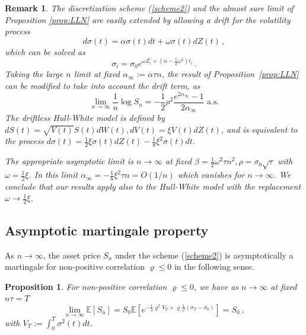 \documentclass[11pt]{article}
\numberwithin{equation}{section}
\theoremstyle{plain}
\newtheorem{proposition}[theorem]{Proposition}
\newtheorem{remark}[theorem]{Remark}
\begin{document}
\begin{remark}\label{rem:4}
The discretization scheme (\ref{scheme2}) and the almost sure limit of 
Proposition \ref{prop:LLN} are easily extended by allowing a drift 
for the volatility process 
\begin{equation}
d\sigma(t) = \alpha \sigma(t) dt + \omega \sigma(t) dZ(t)\,,
\end{equation}
which can be solved as
\begin{equation}
\sigma_i = \sigma_0 e^{\omega Z_i + (\alpha - \frac12\omega^2)t_i}\,.
\end{equation}
Taking the large $n$ limit at fixed $\alpha_\infty:=\alpha \tau n $,
the result of Proposition~\ref{prop:LLN}  can be modified to take into account 
the drift term, as
\begin{equation}
\lim_{n\to \infty} \frac{1}{n} \log S_n = - \frac12 \rho^2 
\frac{e^{2\alpha_\infty}-1}{2\alpha_\infty} \mbox{ a.s.}
\end{equation}
The driftless Hull-White model \cite{HW1987} is defined 
by $dS(t) = \sqrt{V(t)} S(t) dW(t), dV(t) = \xi V(t) dZ(t)$, 
and is equivalent to the
process $d\sigma(t) = \frac12 \xi \sigma(t) dZ(t) - \frac18 \xi^2 \sigma(t) dt$.

The appropriate asymptotic limit is $n\to \infty$ at fixed $\beta = \frac12
\omega^2 \tau n^2, \rho = \sigma_0\sqrt{\tau}$ with $\omega=\frac12\xi$. 
In this limit $\alpha_\infty=-\frac18 \xi^2\tau n = O(1/n)$ which vanishes
for $n\to \infty$. We conclude that our results apply also to the Hull-White 
model with the replacement $\omega \to \frac12\xi$.
\end{remark}



\subsection{Asymptotic martingale property}

As $n\rightarrow\infty$, the asset price $S_n$ under the scheme
(\ref{scheme2}) is asymptotically a martingale for non-positive correlation $\varrho \leq 0$
in the following sense.

\begin{proposition}
For non-positive correlation $\varrho \leq 0$,
we have as $n\to \infty$ at fixed $n\tau = T$
\begin{equation}\label{S0m}
\lim_{n\to \infty} \mathbb{E}[S_n] = S_0 \mathbb{E}\left[e^{-\frac12\varrho^2 V_T
+ \varrho \frac{1}{\omega} (\sigma_T - \sigma_0)}\right] = S_0 \,,
\end{equation}
with $V_T := \int_0^T \sigma^2(t)  dt$.
\end{proposition}
\end{document}
